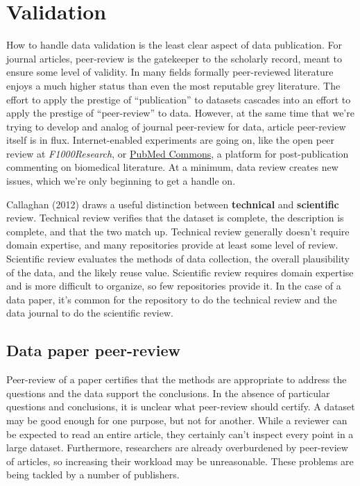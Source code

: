 \documentclass[10pt,twocolumn]{article}
\begin{document}
\section*{Validation}\label{validation}

How to handle data validation is the least clear aspect of data publication.
For journal articles, peer-review is the gatekeeper to the scholarly record, meant to ensure some level of validity.
In many fields formally peer-reviewed literature enjoys a much higher status than even the most reputable grey literature.
The effort to apply the prestige of ``publication'' to datasets cascades into an effort to apply the prestige of ``peer-review'' to data.
However, at the same time that we're trying to develop and analog of journal peer-review for data, article peer-review itself is in flux.
Internet-enabled experiments are going on, like the open peer review at \emph{F1000Research}, or \href{http://www.ncbi.nlm.nih.gov/pubmedcommons/}{PubMed Commons}, a platform for post-publication commenting on biomedical literature.
At a minimum, data review creates new issues, which we're only beginning to get a handle on.

Callaghan (2012)\cite{sarah_callaghan_making_2012} draws a useful distinction between \textbf{technical} and \textbf{scientific} review.
Technical review verifies that the dataset is complete, the description is complete, and that the two match up.
Technical review generally doesn't require domain expertise, and many repositories provide at least some level of review.
Scientific review evaluates the methods of data collection, the overall plausibility of the data, and the likely reuse value.
Scientific review requires domain expertise and is more difficult to organize, so few repositories provide it.
In the case of a data paper, it's common for the repository to do the technical review and the data journal to do the scientific review.

\subsection*{Data paper peer-review}\label{data-paper-peer-review}

Peer-review of a paper certifies that the methods are appropriate to address the questions and the data support the conclusions.
In the absence of particular questions and conclusions, it is unclear what peer-review should certify.
A dataset may be good enough for one purpose, but not for another.\cite{parsons_data_2010}
While a reviewer can be expected to read an entire article, they certainly can't inspect every point in a large dataset.
Furthermore, researchers are already overburdened by peer-review of articles, so increasing their workload may be unreasonable.
These problems are being tackled by a number of publishers.
\end{document}
